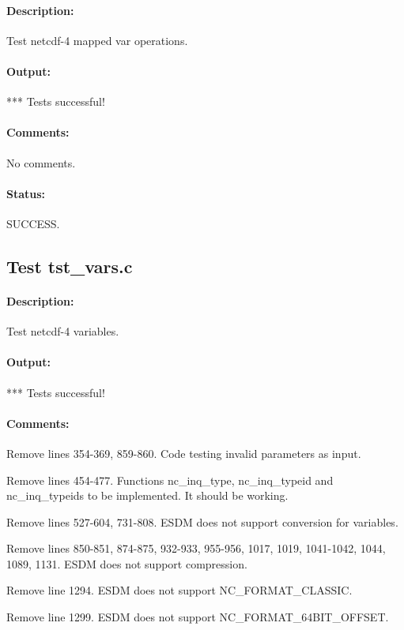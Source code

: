 \paragraph{Description:} Test netcdf-4 mapped var operations.

\paragraph{Output:} *** Tests successful!

\paragraph{Comments:} No comments.

\paragraph{Status:} SUCCESS.

\subsection{Test tst\_vars.c}

\paragraph{Description:} Test netcdf-4 variables.

\paragraph{Output:} *** Tests successful!

\paragraph{Comments:}

Remove lines 354-369, 859-860. Code testing invalid parameters as input.

Remove lines 454-477. Functions nc\_inq\_type, nc\_inq\_typeid and nc\_inq\_typeids to be implemented. It should be working.

Remove lines 527-604, 731-808. ESDM does not support conversion for variables.

Remove lines 850-851, 874-875, 932-933, 955-956, 1017, 1019, 1041-1042, 1044, 1089, 1131. ESDM does not support compression.

Remove line 1294. ESDM does not support NC\_FORMAT\_CLASSIC.

Remove line 1299. ESDM does not support NC\_FORMAT\_64BIT\_OFFSET.

